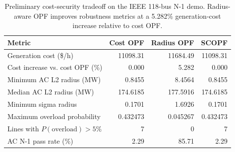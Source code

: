 \begin{table}[t]
\centering
\caption{Preliminary cost-security tradeoff on the IEEE 118-bus N-1 demo. Radius-aware OPF improves robustness metrics at a 5.282\% generation-cost increase relative to cost OPF.\label{tab:dispatch-tradeoff}}
\footnotesize
\begin{tabularx}{\textwidth}{@{}Xrrr@{}}
\toprule
Metric & Cost OPF & Radius OPF & SCOPF \\
\midrule
Generation cost (\$/h) & 11098.31 & 11684.49 & 11098.31 \\
Cost increase vs. cost OPF (\%) & 0.000 & 5.282 & 0.000 \\
Minimum AC L2 radius (MW) & 0.8455 & 8.4564 & 0.8455 \\
Median AC L2 radius (MW) & 174.6185 & 177.5916 & 174.6185 \\
Minimum sigma radius & 0.1701 & 1.6926 & 0.1701 \\
Maximum overload probability & 0.432473 & 0.045267 & 0.432473 \\
Lines with $P(\mathrm{overload})>5\%$ & 7 & 0 & 7 \\
AC N-1 pass rate (\%) & 2.29 & 85.71 & 2.29 \\
\bottomrule
\end{tabularx}
\end{table}
